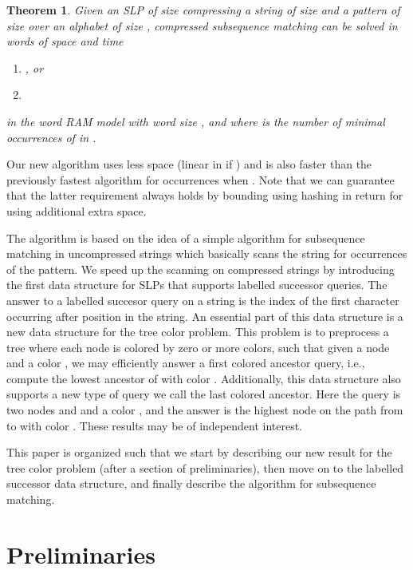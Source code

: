 \documentclass[11pt]{article}
\newtheorem{theorem}{Theorem}
\begin{document}
\begin{theorem}\label{thm:SCSM}
Given an SLP  of size  compressing a string  of size  and a pattern  of size  over an alphabet of size , compressed subsequence matching can be solved in  words of space and time
\begin{enumerate}
\item[\textit{(i)}] , or
\item[\textit{(ii)}] 
\end{enumerate}
in the word RAM model with word size , and where  is the number of minimal occurrences of  in .
\end{theorem}

\noindent Our new algorithm uses less space (linear in  if ) and is also faster than the previously fastest algorithm for  occurrences when . Note that we can guarantee that the latter requirement always holds by bounding  using hashing in return for using  additional extra space.

The algorithm is based on the idea of a simple algorithm for subsequence matching in uncompressed strings which basically scans the string for occurrences of the pattern. We speed up the scanning on compressed strings by introducing the first data structure for SLPs that supports labelled successor queries. The answer to a labelled succesor query  on a string is the index of the first character  occurring after position  in the string. An essential part of this data structure is a new data structure for the tree color problem. This problem is to preprocess a tree where each node is colored by zero or more colors, such that given a node  and a color , we may efficiently answer a first colored ancestor query, i.e., compute the lowest ancestor of  with color . Additionally, this data structure also supports a new type of query we call the last colored ancestor. Here the query is two nodes  and  and a color , and the answer is the highest node on the path from  to  with color . These results may be of independent interest.





This paper is organized such that we start by describing our new result for the tree color problem (after a section of preliminaries), then move on to the labelled successor data structure, and finally describe the algorithm for subsequence matching.

\section{Preliminaries}
\end{document}

